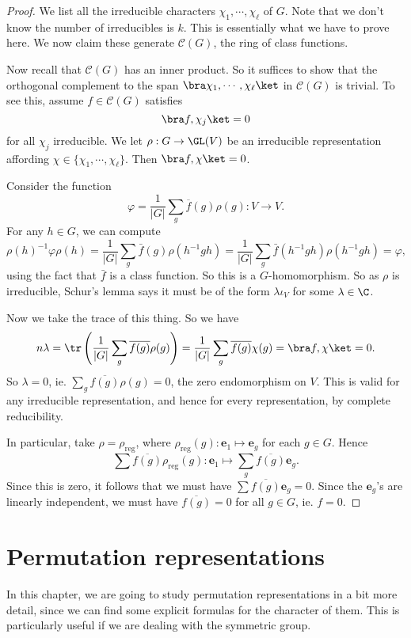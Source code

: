 \documentclass[a4paper]{article}
\begin{document}
\begin{proof}
  We list all the irreducible characters $\chi_1, \cdots, \chi_\ell$ of $G$. Note that we don't know the number of irreducibles is $k$. This is essentially what we have to prove here. We now claim these generate $\mathcal{C}(G)$, the ring of class functions.

  Now recall that $\mathcal{C}(G)$ has an inner product. So it suffices to show that the orthogonal complement to the span $\bra \chi_1, \cdots, \chi_\ell\ket$ in $\mathcal{C}(G)$ is trivial. To see this, assume $f \in \mathcal{C}(G)$ satisfies
  \[
    \bra f, \chi_j\ket = 0
  \]
  for all $\chi_j$ irreducible. We let $\rho: G \to \GL(V)$ be an irreducible representation affording $\chi \in \{\chi_1, \cdots, \chi_\ell\}$. Then $\bra f, \chi\ket = 0$.

  Consider the function
  \[
    \varphi = \frac{1}{|G|} \sum_g \overline{f}(g) \rho(g): V \to V.
  \]
  For any $h \in G$, we can compute
  \[
    \rho(h)^{-1} \varphi \rho(h) = \frac{1}{|G|} \sum_g \bar{f}(g) \rho (h^{-1} gh) = \frac{1}{|G|} \sum_g \bar{f}(h^{-1}gh) \rho(h^{-1}gh) = \varphi,
  \]
  using the fact that $\bar{f}$ is a class function. So this is a $G$-homomorphism. So as $\rho$ is irreducible, Schur's lemma says it must be of the form $\lambda \iota_V$ for some $\lambda \in \C$.

  Now we take the trace of this thing. So we have
  \[
    n\lambda = \tr\left(\frac{1}{|G|} \sum_g \overline{f(g)} \rho(g)\right) = \frac{1}{|G|} \sum_g \overline{f(g)} \chi(g) = \bra f, \chi\ket = 0.
  \]
  So $\lambda = 0$, ie. $\sum_g \overline{f(g)} \rho(g) = 0$, the zero endomorphism on $V$. This is valid for any irreducible representation, and hence for every representation, by complete reducibility.

  In particular, take $\rho = \rho_{\mathrm{reg}}$, where $\rho_{\mathrm{reg}}(g): \mathbf{e}_1 \mapsto \mathbf{e}_g$ for each $g \in G$. Hence
  \[
    \sum \overline{f(g)} \rho_{\mathrm{reg}}(g): \mathbf{e}_1 \mapsto \sum_g \overline{f(g)} \mathbf{e}_g.
  \]
  Since this is zero, it follows that we must have $\sum \overline{f(g)} \mathbf{e}_g = 0$. Since the $\mathbf{e}_g$'s are linearly independent, we must have $\overline{f(g)} = 0$ for all $g \in G$, ie. $f = 0$.
\end{proof}

\section{Permutation representations}
In this chapter, we are going to study permutation representations in a bit more detail, since we can find some explicit formulas for the character of them. This is particularly useful if we are dealing with the symmetric group.
\end{document}
